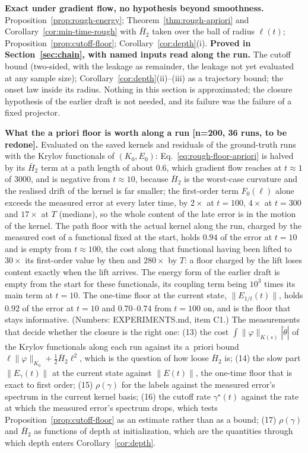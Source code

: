 \textbf{Exact under gradient flow, no hypothesis beyond smoothness.}
Proposition~\ref{prop:rough-energy}; Theorem~\ref{thm:rough-apriori} and
Corollary~\ref{cor:min-time-rough} with $\bar H_2$ taken over the ball of
radius $\ell(t)$; Proposition~\ref{prop:cutoff-floor}; Corollary~\ref{cor:depth}(i).
\textbf{Proved in Section~\ref{sec:chain}, with named inputs read along the run.} The cutoff bound (two-sided, with
the leakage as remainder, the leakage not yet evaluated at any sample size);
Corollary~\ref{cor:depth}(ii)--(iii) as a trajectory bound; the onset law
inside its radius.
Nothing in this section is approximated; the closure hypothesis of the earlier
draft is not needed, and its failure was the failure of a fixed projector.

\textbf{What the a priori floor is worth along a run [n=200, 36 runs, to be
redone].} Evaluated on the saved kernels and residuals of the ground-truth runs
with the Krylov functionals of $(K_0,E_0)$:
Eq.~\eqref{eq:rough-floor-apriori} is halved by its $\bar H_2$ term at a path
length of about $0.6$, which gradient flow reaches at $t\approx1$ of $3000$,
and is negative from $t\approx10$, because $\bar H_2$ is the worst-case
curvature and the realised drift of the kernel is far smaller; the first-order
term $F_0(\ell)$ alone exceeds the measured error at every later time, by
$2\times$ at $t=100$, $4\times$ at $t=300$ and $17\times$ at $T$ (medians), so
the whole content of the late error is in the motion of the kernel. The path
floor with the actual kernel along the run, charged by the measured cost of a
functional fixed at the start, holds $0.94$ of the error at $t=10$ and is
empty from $t\approx100$, the cost along that functional having been lifted
to $30\times$ its first-order value by then and $280\times$ by $T$: a floor
charged by the lift loses content exactly when the lift arrives. The energy
form of the earlier draft is empty from the start for these functionals, its
coupling term being $10^3$ times its main term at $t=10$. The one-time floor
at the current state, $\|E_{1/t}(t)\|$, holds $0.92$ of the error at $t=10$ and
$0.70$--$0.74$ from $t=100$ on, and is the floor that stays informative.
(Numbers: EXPERIMENTS.md, item C1.)
The measurements that decide whether the closure is the right one: (13) the
cost $\int\|\varphi\|_{K(s)}|\dot\theta|$ of the Krylov functionals along each
run against its a~priori bound $\ell\|\varphi\|_{K_0}+\tfrac12\bar H_2\ell^2$,
which is the question of how loose $\bar H_2$ is; (14) the slow part
$\|E_\gamma(t)\|$ at the current state against $\|E(t)\|$, the one-time floor
that is exact to first order; (15) $\rho(\gamma)$ for the labels against the
measured error's spectrum in the current kernel basis; (16) the cutoff rate
$\gamma^\star(t)$ against the rate at which the measured error's spectrum
drops, which tests Proposition~\ref{prop:cutoff-floor} as an estimate rather
than as a bound; (17) $\rho(\gamma)$ and $\bar H_2$ as functions of depth at
initialization, which are the quantities through which depth enters
Corollary~\ref{cor:depth}.
